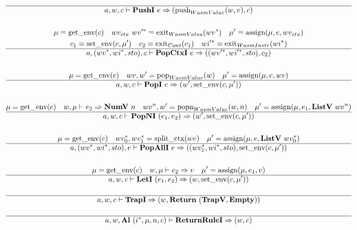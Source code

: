 \begin{gather*}
  \hline
  a, w, c \vdash \pushi ~ e \Rightarrow (\push_{WasmValue}(w, v), c) \\
%
\newline \\
  \mu = \getenv(c) \quad
  wv_{ctx} ~ \seq{wv'} = \exit_{WasmValue}(\seq{wv}) \quad
  \mu' = \assign(\mu, e, wv_{ctx}) \\
  c_1 = \setenv(c, \mu') \quad
  c_2 = \exit_{Cont}(c_1) \quad
  \seq{wi'} = \exit_{WasmInstr}(\seq{wi}) \\
  \hline
  a, (\seq{wv}, \seq{wi}, sto), c \vdash \popctxi ~ e
  \Rightarrow
  ((\seq{wv'}, \seq{wi'}, sto), c_2) \\
%
\newline \\
  \mu = \getenv(c) \quad
  wv, w' = \pop_{WasmValue}(w) \quad
  \mu' = \assign(\mu, e, wv) \\
  \hline
  a, w, c \vdash \popi ~ e \Rightarrow (w', \setenv(c, \mu')) \\
%
\newline \\
  \mu = \getenv(c) \quad
  w, \mu \vdash e_2 \Rightarrow \numv ~ n \quad
  wv^n, w' = \popn_{WasmValue}(w, n) \quad
  \mu' = \assign(\mu, e_1, \listv ~ wv^n) \\
  \hline
  a, w, c \vdash \popni ~ (e_1, e_2) \Rightarrow (w', \setenv(c, \mu')) \\
%
\newline \\
  \mu = \getenv(c) \quad
  \seq{wv_0}, \seq{wv_1} = \splitctx(wv) \quad
  \mu' = \assign(\mu, e, \listv ~ \seq{wv_0}) \\
  \hline
  a, (\seq{wv}, \seq{wi}, sto), e \vdash \popalli ~ e
  \Rightarrow
  ((\seq{wv_1}, \seq{wi}, sto), \setenv(c, \mu')) \\
%
\newline \\
  \mu = \getenv(c) \quad
  w, \mu \vdash e_2 \Rightarrow v \quad
  \mu' = \assign(\mu, e_1, v) \\
  \hline
  a, w, c \vdash \leti ~ (e_1, e_2)
  \Rightarrow
  (w, \setenv(c, \mu')) \\
%
\newline \\
  \hline
  a, w, c \vdash \trapi \Rightarrow (w, \ret ~ (\trapv, \mt)) \\
%
\newline \\
  \hline
  a, w, \al~ (\seq{i}, \mu, n, c) \vdash \returnrulei \Rightarrow (w, c) \\

\end{gather*}
